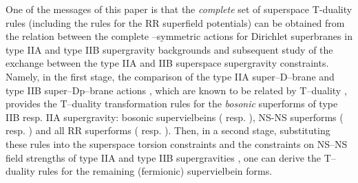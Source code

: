 \documentclass[a4paper,11pt]{article}
\begin{document}
One of the messages of this paper is that the {\it complete} set of 
superspace T-duality rules 
(including the rules for the RR superfield potentials)
can be obtained from the relation between 
the complete \myHighlight{$\kappa$}\coordHE{}--symmetric actions 
for Dirichlet superbranes in type IIA and type IIB 
supergravity backgrounds 
and subsequent study of the
exchange between the type IIA and IIB superspace supergravity constraints.  
Namely, in the first stage, the comparison of the 
type IIA super--D\coordHE{}--brane and type IIB 
super--Dp--brane actions \cite{c0}, 
which are known to be related by T--duality \cite{Polch0,Polch}, 
provides  the T--duality transformation rules for the {\it bosonic} superforms 
of type IIB resp. IIA supergravity:   
bosonic supervielbeins (\coordHE{} resp. \coordHE{}), 
NS-NS superforms (\coordHE{} resp. \coordHE{})
and all RR superforms (\coordHE{} resp. \coordHE{}).   
Then, in a second stage, 
substituting these rules into the 
superspace torsion constraints and the constraints 
on NS--NS field strengths of type IIA and type IIB supergravities 
\cite{HW84,CGO87,c0}, one can derive the T--duality rules for the remaining 
(fermionic) supervielbein forms.  
\end{document}
